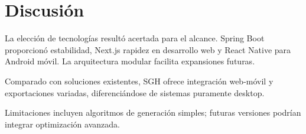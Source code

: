 \section{Discusión}
La elección de tecnologías resultó acertada para el alcance. Spring Boot proporcionó estabilidad, Next.js rapidez en desarrollo web y React Native para Android móvil. La arquitectura modular facilita expansiones futuras.

Comparado con soluciones existentes, SGH ofrece integración web-móvil y exportaciones variadas, diferenciándose de sistemas puramente desktop.

Limitaciones incluyen algoritmos de generación simples; futuras versiones podrían integrar optimización avanzada.